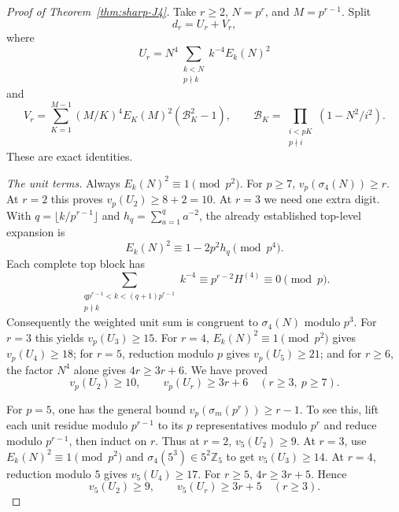 \documentclass[11pt]{amsart}
\theoremstyle{definition}
\theoremstyle{remark}
\begin{document}
\begin{proof}[Proof of Theorem~\ref{thm:sharp-J4}]
Take $r\ge2$, $N=p^r$, and $M=p^{r-1}$. Split
\[
d_r=U_r+V_r,
\]
where
\[
U_r=N^4\sum_{\substack{k<N\\p\nmid k}}k^{-4}E_k(N)^2
\]
and
\[
V_r=\sum_{K=1}^{M-1}(M/K)^4E_K(M)^2
 (\mathcal B_K^2-1),\qquad
\mathcal B_K=\prod_{\substack{i<pK\\p\nmid i}}(1-N^2/i^2).
\]
These are exact identities.

\emph{The unit terms.}
Always $E_k(N)^2\equiv1\pmod{p^2}$. For $p\ge7$,
$v_p(\sigma_4(N))\ge r$. At $r=2$ this proves
$v_p(U_2)\ge8+2=10$.
At $r=3$ we need one extra digit. With
$q=\lfloor k/p^{r-1}\rfloor$ and $h_q=\sum_{a=1}^qa^{-2}$, the
already established top-level expansion is
\[
E_k(N)^2\equiv1-2p^2h_q\pmod{p^4}.
\]
Each complete top block has
\[
\sum_{\substack{qp^{r-1}<k<(q+1)p^{r-1}\\p\nmid k}}k^{-4}
\equiv p^{r-2}H^{(4)}\equiv0\pmod p.
\]
Consequently the weighted unit sum is congruent to $\sigma_4(N)$
modulo $p^3$. For $r=3$ this yields $v_p(U_3)\ge15$.
For $r=4$, $E_k(N)^2\equiv1\pmod{p^2}$ gives $v_p(U_4)\ge18$;
for $r=5$, reduction modulo $p$ gives $v_p(U_5)\ge21$;
and for $r\ge6$, the factor $N^4$ alone gives
$4r\ge3r+6$. We have proved
\begin{equation}\label{eq:unit-sharp}
v_p(U_2)\ge10,\qquad v_p(U_r)\ge3r+6\quad(r\ge3,\ p\ge7).
\end{equation}

For $p=5$, one has the general bound
$v_p(\sigma_m(p^r))\ge r-1$. To see this, lift each unit residue
modulo $p^{r-1}$ to its $p$ representatives modulo $p^r$ and reduce
modulo $p^{r-1}$, then induct on $r$.
Thus at $r=2$, $v_5(U_2)\ge9$. At $r=3$, use
$E_k(N)^2\equiv1\pmod{p^2}$ and $\sigma_4(5^3)\in5^2\mathbb Z_5$
to get $v_5(U_3)\ge14$. At $r=4$, reduction modulo $5$ gives
$v_5(U_4)\ge17$. For $r\ge5$, $4r\ge3r+5$. Hence
\begin{equation}\label{eq:unit-sharp-five}
v_5(U_2)\ge9,\qquad v_5(U_r)\ge3r+5\quad(r\ge3).
\end{equation}


\end{proof}
\end{document}
